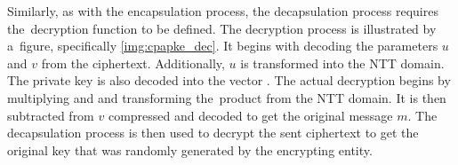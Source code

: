 Similarly, as with the encapsulation process, the decapsulation process requires the~decryption function to be defined. The decryption process is illustrated by a~figure, specifically \ref{img:cpapke_dec}. It begins with decoding the parameters $u$ and $v$ from the ciphertext. Additionally, $u$ is transformed into the NTT domain. The private key is also decoded into the vector . The actual decryption begins by multiplying  and  and transforming the~product from the NTT domain. It is then subtracted from $v$ compressed and decoded to get the original message $m$. The decapsulation process is then used to decrypt the sent ciphertext to get the original key that was randomly generated by the encrypting entity.


